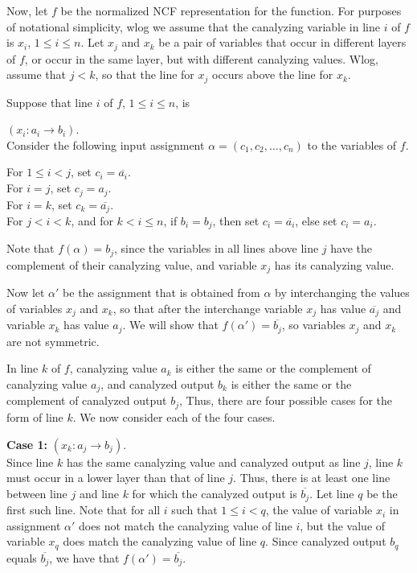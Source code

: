 Now, let $f$ be the normalized NCF representation for the function.
For purposes of notational simplicity, wlog we assume that the
canalyzing variable in line $i$ of $f$ is $x_i$, $1 \leq i \leq n$.
Let  $x_j$ and $x_k$ be a pair of variables that occur in different
layers of $f$, or occur in the same layer, but with different
canalyzing values.  Wlog, assume that $j < k$, so that the line for
$x_j$ occurs above the line for $x_k$.

Suppose that line $i$ of $f$, $1 \leq i \leq n$, is 

\noindent
$(x_i : a_i \rightarrow b_i)$. \\
Consider the following input assignment $\alpha = (c_1, c_2, \ldots,  c_n)$ 
to the variables of $f$.

\noindent
For $1 \leq i < j$, set $c_i = \overline{a_i}$. \\
For $i = j$, set $c_j =a_j$. \\
For $i = k$, set $c_k =\overline{a_j}$. \\
For $j < i < k$, and for  $k < i \leq n$, 
if $b_i = b_j$, then set $c_i =  \overline{a_i}$,
else set $c_i =  a_i$.

Note that $f(\alpha) = b_j$, since the variables in all lines above
line $j$ have the complement of their canalyzing value, and variable
$x_j$ has its canalyzing value.

Now let $\alpha'$ be the assignment that is obtained from $\alpha$
by interchanging the values of variables $x_j$ and $x_k$, so that
after the interchange variable $x_j$ has value $\overline{a_j}$ and
variable $x_k$ has value $a_j$.  We will show that $f(\alpha') =
\overline{b_j}$, so variables $x_j$ and $x_k$ are not symmetric.

In line $k$ of $f$, canalyzing value $a_k$ is either the same or
the complement of canalyzing value $a_j$, and canalyzed output $b_k$
is either the same or the complement of canalyzed output $b_j$,
Thus, there are four possible cases for the form of line $k$.  We
now consider each of the four cases.

\noindent
{\bf Case 1:} $(x_k : a_j \rightarrow b_j)$. \\ 

Since line $k$ has
the same canalyzing value and canalyzed output as line $j$, line
$k$ must occur in a lower layer than that of line $j$.  Thus, there
is at least one line between line $j$ and line $k$ for which the
canalyzed output is $\overline{b_j}$.  Let line $q$ be the first
such line.  Note that for all $i$ such that $1 \leq i < q$, the
value of variable $x_i$ in assignment $\alpha'$ does not match the
canalyzing value of line $i$, but the value of variable $x_q$ does
match the canalyzing value of line $q$.  Since canalyzed output
$b_q$ equals $\overline{b_j}$, we have that $f(\alpha') =
\overline{b_j}$.

